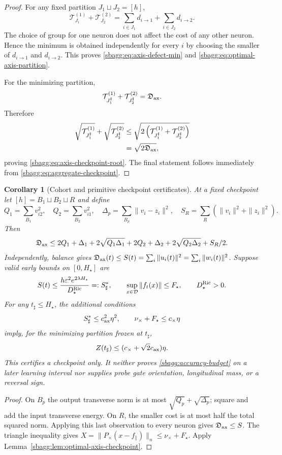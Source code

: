 \documentclass{article} %
\theoremstyle{plain}
\newtheorem{corollary}[theorem]{Corollary}
\theoremstyle{definition}
\theoremstyle{remark}
\begin{document}
\begin{proof}
For any fixed partition $J_1\sqcup J_2=[h]$,
\[
\mathcal T_{J_1}^{(1)}
+
\mathcal T_{J_2}^{(2)}
=
\sum_{i\in J_1}d_{i\to1}
+
\sum_{i\in J_2}d_{i\to2}.
\]
The choice of group for one neuron does not affect the cost of any other
neuron.  Hence the minimum is obtained independently for every $i$ by
choosing the smaller of $d_{i\to1}$ and $d_{i\to2}$.  This proves
\eqref{sbagg:eq:axis-defect-min} and
\eqref{sbagg:eq:optimal-axis-partition}.

For the minimizing partition,
\[
\mathcal T_{J_1^\sharp}^{(1)}
+
\mathcal T_{J_2^\sharp}^{(2)}
=
\mathfrak D_{\rm ax}.
\]
Therefore
\[
\begin{aligned}
\sqrt{\mathcal T_{J_1^\sharp}^{(1)}}
+
\sqrt{\mathcal T_{J_2^\sharp}^{(2)}}
&\le
\sqrt{
2\left(
\mathcal T_{J_1^\sharp}^{(1)}
+
\mathcal T_{J_2^\sharp}^{(2)}
\right)
}
\\
&=
\sqrt{2\mathfrak D_{\rm ax}},
\end{aligned}
\]
proving \eqref{sbagg:eq:axis-checkpoint-root}.  The final statement follows
immediately from \eqref{sbagg:eq:aggregate-checkpoint}.
\end{proof}


\begin{corollary}[Cohort and primitive checkpoint certificates]
\label{sbagg:primitive}
At a fixed checkpoint let $[h]=B_1\sqcup B_2\sqcup R$ and define
\[
 Q_1=\sum_{B_1}v_{i2}^2,\quad Q_2=\sum_{B_2}v_{i1}^2,\quad
 \Delta_p=\sum_{B_p}\|v_i-z_i\|^2,\quad
 S_R=\sum_R(\|v_i\|^2+\|z_i\|^2).
\]
Then
\[
 \mathfrak D_{\rm ax}\le
 2Q_1+\Delta_1+2\sqrt{Q_1\Delta_1}
 +2Q_2+\Delta_2+2\sqrt{Q_2\Delta_2}+S_R/2.
\]
Independently, balance gives
$\mathfrak D_{\rm ax}(t)\le S(t)=\sum_i\|u_i(t)\|^2
=\sum_i\|w_i(t)\|^2$.
Suppose valid early bounds on $[0,H_\star]$ are
\[
 S(t)\le \frac{h\varepsilon^2e^{2\lambda H_\star}}
                         {D_\star^{\rm Ric}}=:S_\sharp^*,
 \qquad \sup_{x\in\mathcal D}\|f_t(x)\|\le F_\star,
 \qquad D_\star^{\rm Ric}>0.
\]
For any $t_\sharp\le H_\star$, the additional conditions
\[
 S_\sharp^*\le c_{\rm ax}^2\eta^2,\qquad
 \nu_\times+F_\star\le c_\times\eta
\]
imply, for the minimizing partition frozen at $t_\sharp$,
\[
 Z(t_\sharp)\le(c_\times+\sqrt2c_{\rm ax})\eta.
\]
This certifies a checkpoint only. It neither proves
\eqref{sbagg:accuracy-budget} on a later learning interval nor supplies
probe gate orientation, longitudinal mass, or a reversal sign.
\end{corollary}
\begin{proof}
On $B_p$ the output transverse norm is at most
$\sqrt{Q_p}+\sqrt{\Delta_p}$; square and add the input transverse energy.
On $R$, the smaller cost is at most half the total squared norm.
Applying this last observation to every neuron gives
$\mathfrak D_{\rm ax}\le S$.
The triangle inequality gives
$X=\|P_\times(x-f_\parallel)\|_n\le\nu_\times+F_\star$.
Apply Lemma~\ref{sbagg:lem:optimal-axis-checkpoint}.
\end{proof}
\end{document}
